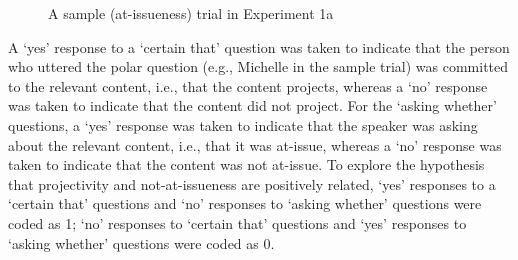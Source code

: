 \documentclass[11pt,fleqn]{article}
\newcommand{\6}{\mbox{$[\hspace*{-.6mm}[$}}
\newcommand{\9}{\mbox{$]\hspace*{-.6mm}]$}}
\begin{document}
\begin{figure}[!h]
\begin{center}
\end{center}
\caption{A sample (at-issueness) trial in Experiment 1a}\label{f-trial-exp1}
\end{figure}

A `yes' response to a `certain that' question was taken to indicate that the person who uttered the polar question (e.g., Michelle in the sample trial) was committed to the relevant content, i.e., that the content projects, whereas a `no' response was taken to indicate that the content did not project. For the `asking whether' questions, a `yes'  response was taken to indicate that the speaker was asking about the relevant content, i.e., that it was at-issue, whereas a `no' response was taken to indicate that the content was not at-issue. To explore the hypothesis that projectivity and not-at-issueness are positively related,  `yes' responses to a `certain that' questions and `no' responses to `asking whether' questions were coded as 1; `no' responses to `certain that' questions and `yes' responses to `asking whether' questions were coded as 0.
\end{document}
